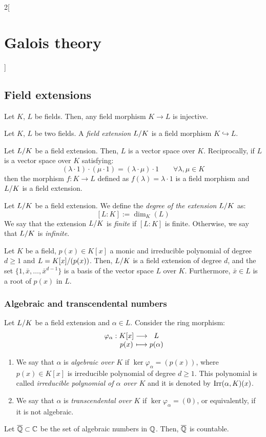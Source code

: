 \documentclass[../../../main.tex]{subfiles}
\begin{document}
\begin{multicols}{2}[\section{Galois theory}]
  \subsection{Field extensions}
  \begin{prop}
    Let $K$, $L$ be fields. Then, any field morphism $K\rightarrow L$ is injective.
  \end{prop}
  \begin{definition}
    Let $K$, $L$ be two fields. A \textit{field extension $\quot{L}{K}$} is a field morphism $K\hookrightarrow L$.
  \end{definition}
  \begin{prop}
    Let $\quot{L}{K}$ be a field extension. Then, $L$ is a vector space over $K$. Reciprocally, if $L$ is a vector space over $K$ satisfying: $$(\lambda\cdot 1)\cdot(\mu\cdot 1)=(\lambda\cdot\mu)\cdot 1\qquad\forall\lambda,\mu\in K$$ then the morphism $f:K\rightarrow L$ defined as $f(\lambda)=\lambda\cdot 1$ is a field morphism and $\quot{L}{K}$ is a field extension.
  \end{prop}
  \begin{definition}
    Let $\quot{L}{K}$ be a field extension. We define the \textit{degree of the extension $\quot{L}{K}$} as: $$[L:K]:=\dim_K(L)$$ We say that the extension $\quot{L}{K}$ is \textit{finite} if $[L:K]$ is finite. Otherwise, we say that $\quot{L}{K}$ is \textit{infinite}.
  \end{definition}
  \begin{lemma}
    Let $K$ be a field, $p(x)\in K[x]$ a monic and irreducible polynomial of degree $d\geq 1$ and $L=\quot{K[x]}{(p(x))}$. Then, $\quot{L}{K}$ is a field extension of degree $d$, and the set $\{1,\bar{x},\ldots,{\bar{x}}^{d-1}\}$ is a basis of the vector space $L$ over $K$. Furthermore, $\bar{x}\in L$ is a root of $p(x)$ in $L$.
  \end{lemma}
  \subsubsection{Algebraic and transcendental numbers}
  \begin{definition}
    Let $\quot{L}{K}$ be a field extension and $\alpha\in L$. Consider the ring morphism: $$\function{\varphi_\alpha}{K[x]}{L}{p(x)}{p(\alpha)}$$
    \begin{enumerate}
      \item We say that $\alpha$ is \textit{algebraic over $K$} if $\ker\varphi_\alpha=(p(x))$, where $p(x)\in K[x]$ is irreducible polynomial of degree $d\geq 1$. This polynomial is called \textit{irreducible polynomial of $\alpha$ over $K$} and it is denoted by $\operatorname{Irr}(\alpha,K)(x)$.
      \item We say that $\alpha$ is \textit{transcendental over $K$} if $\ker\varphi_\alpha=(0)$, or equivalently, if it is not algebraic.
    \end{enumerate}
  \end{definition}
  \begin{theorem}
    Let $\overline{\mathbb{Q}}\subset\mathbb{C}$ be the set of algebraic numbers in $\mathbb{Q}$. Then, $\overline{\mathbb{Q}}$ is countable.
  \end{theorem}

\end{multicols}
\end{document}
